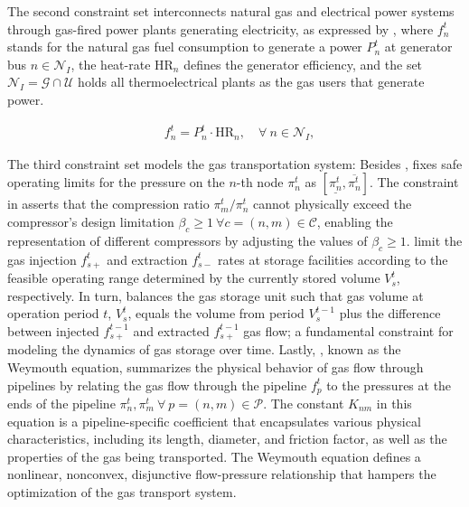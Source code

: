 The second constraint set interconnects natural gas and electrical power systems through gas-fired power plants generating electricity, as expressed by  , where $f_{n}^t$ stands for the natural gas fuel consumption to generate a power $P_{n}^t$ at generator bus $n\in\mathcal{N}_I$, the heat-rate $\text{HR}_n$ defines the generator efficiency, and the set $\mathcal{N}_I=\mathcal{G}\cap\mathcal{U}$ holds all thermoelectrical plants as the gas users that generate power.

\begin{align}
    &f_{n}^t = P_{n}^t \cdot \text{HR}_n, \quad \forall \ n \in \mathcal{N}_I, \label{eq:gas_power_relation} 
\end{align}

The third constraint set models the gas transportation system: Besides ,  fixes safe operating limits for the pressure on the $n$-th node $\pi_{n}^t$ as $[\underline{\pi_{n}^t},\overline{\pi_{n}^t}]$. The constraint in  asserts that the compression ratio $\pi_{m}^t / \pi_{n}^t$ cannot physically exceed the compressor's design limitation  $\beta_{c}\geq1 \ \forall c=(n,m) \in \mathcal{C}$, enabling the representation of different compressors by adjusting the values of $\beta_{c}\geq1$.   limit the gas injection $f_{s+}^t$  and extraction $f_{s-}^t$ rates at storage facilities according to the feasible operating range determined by the currently stored volume $V_{s}^t$, respectively. In turn,  balances the gas storage unit such that gas volume at operation period $t$, $V_{s}^t$, equals the volume from period $V_{s}^{t-1}$ plus the difference between injected $f_{s+}^{t-1}$ and extracted $f_{s+}^{t-1}$ gas flow; a fundamental constraint for modeling the dynamics of gas storage over time. Lastly, , known as the Weymouth equation, summarizes the physical behavior of gas flow through pipelines by relating the gas flow through the pipeline $f_{p}^t$ to the pressures at the ends of the pipeline $\pi_{n}^t, \pi_{m}^t \ \forall \ p = (n,m) \in\mathcal{P}$. The constant $K_{nm}$ in this equation is a pipeline-specific coefficient that encapsulates various physical characteristics, including its length, diameter, and friction factor, as well as the properties of the gas being transported. The Weymouth equation defines a nonlinear, nonconvex, disjunctive flow-pressure relationship that hampers the optimization of the gas transport system.


